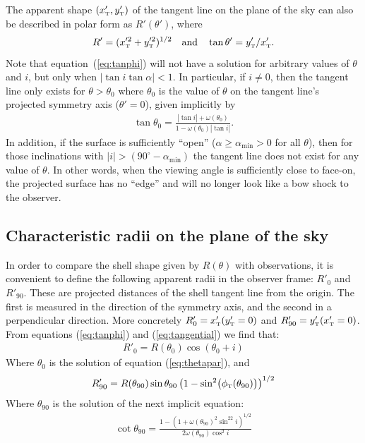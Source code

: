The apparent shape \((x'_{\mathrm{\scriptscriptstyle T}}, y'_{\mathrm{\scriptscriptstyle T}})\) of the tangent line on the plane
of the sky can also be described in polar form as \(R'(\theta')\),
where
\begin{equation}
  \label{eq:R-prime-theta-prime}
  R' = (x'^2_{\mathrm{\scriptscriptstyle T}}+ y'^2_{\mathrm{\scriptscriptstyle T}})^{1/2} 
  \quad \text{and} \quad
  \tan\theta' = y'_{\mathrm{\scriptscriptstyle T}} / x'_{\mathrm{\scriptscriptstyle T}}.
\end{equation}
Note that equation~(\ref{eq:tanphi}) will not have
a solution for arbitrary values of $\theta$ and $i$, but only when
$|\tan i\tan\alpha|<1$. In particular, if $i\neq 0$, then the tangent
line only exists for \(\theta > \theta_{0}\) where \(\theta_{0}\) is the value of \(\theta\) on the tangent line's projected symmetry axis (\(\theta' = 0\)), 
given implicitly by
\begin{align}
\tan\theta_{0} = \frac{|\tan i| + \omega(\theta_{0})}{1-\omega(\theta_{0}) |\tan i|} . 
\label{eq:thetapar}
\end{align}
In addition, if the surface is sufficiently ``open''
(\(\alpha \ge \alpha_{\mathrm{min}} > 0\) for all \(\theta\)), then for those
inclinations with
\(\vert i\vert > (90^\circ - \alpha_{\mathrm{min}}) \) the tangent line does not exist
for any value of \(\theta\).  In other words, when the viewing angle is
sufficiently close to face-on, the projected surface has no ``edge''
and will no longer look like a bow shock to the observer.

\subsection{Characteristic radii on the plane of the sky}

In order to compare the shell shape given by $R(\theta)$ with observations,
it is convenient to define the following apparent radii in the observer frame: $R'_{0}$ and $R'_{90}$. These are projected distances of the shell tangent line
from the origin. The first is measured in the direction of the symmetry axis, and the second in a perpendicular direction. More concretely $R'_{0} = x'_{\mathrm{\scriptscriptstyle T}}(y'_{\mathrm{\scriptscriptstyle T}}=0)$
and $R'_{90} = y'_{\mathrm{\scriptscriptstyle T}}(x'_{\mathrm{\scriptscriptstyle T}}=0)$. From equations (\ref{eq:tanphi}) and (\ref{eq:tangential}) we find that:
\begin{align}
R'_{0} = R(\theta_{0})\cos(\theta_{0} + i) \label{eq:Rpar} 
\end{align}
Where $\theta_{0}$ is the solution of equation (\ref{eq:thetapar}), and
\begin{align}
R'_{90} = R(\theta_{90})\sin\theta_{90}\left(1-\sin^2\bigl(\phi_{\mathrm{\scriptscriptstyle T}}(\theta_{90})\bigr)\right)^{1/2}
\end{align}
Where $\theta_{90}$ is the solution of the next implicit equation:
\begin{align}
\cot\theta_{90} = \frac{1-\left(1+\omega(\theta_{90})^2\sin^22i\right)^{1/2}}{2\omega(\theta_{90})\cos^2 i}
\end{align}


